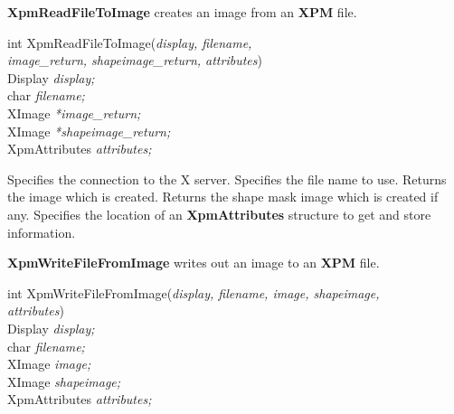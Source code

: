 \vspace{.2cm}
{\bf XpmReadFileToImage} creates an image from an {\bf XPM} file.

\begin{flushleft} 

int XpmReadFileToImage({\it display, filename, \\
\hspace{3cm}image\_return, shapeimage\_return, attributes})\\

\hspace{1cm}Display {\it *display;}\\
\hspace{1cm}char {\it *filename;}\\
\hspace{1cm}XImage {\it **image\_return;}\\
\hspace{1cm}XImage {\it **shapeimage\_return;}\\
\hspace{1cm}XpmAttributes {\it *attributes;}

\end{flushleft}

\begin{description}

 Specifies the connection to the X server.
 Specifies the file name to use.
 Returns the image which is created.
 Returns the shape mask image which is created if
any.
 Specifies the location of an {\bf XpmAttributes} structure
to get and store information.

\end{description} 

\vspace{.5cm}
{\bf XpmWriteFileFromImage} writes out an image to an {\bf XPM} file.

\begin{flushleft} 

int XpmWriteFileFromImage({\it display, filename, image, shapeimage,\\
\hspace{3cm}attributes})\\

\hspace{1cm}Display {\it *display;}\\
\hspace{1cm}char {\it *filename;}\\
\hspace{1cm}XImage {\it *image;}\\
\hspace{1cm}XImage {\it *shapeimage;}\\
\hspace{1cm}XpmAttributes {\it *attributes;}

\end{flushleft}

